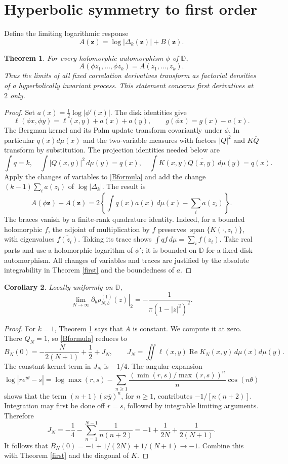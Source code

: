 \documentclass[11pt]{article}
\newtheorem{theorem}{Theorem}[section]
\newtheorem{corollary}[theorem]{Corollary}
\theoremstyle{remark}\newtheorem{remark}[theorem]{Remark}
\newcommand{\D}{\mathbb D}
\newcommand{\Rea}{\operatorname{Re}}
\begin{document}
\section{Hyperbolic symmetry to first order}
Define the limiting logarithmic response
\[
 A(\mathbf z)=\log|\Delta_k(\mathbf z)|+B(\mathbf z).
\]
\begin{theorem}\label{symmetry}
For every holomorphic automorphism $\phi$ of $\D$,
\[
 A(\phi z_1,\ldots,\phi z_k)=A(z_1,\ldots,z_k).
\]
Thus the limits of all fixed correlation derivatives transform as factorial
densities of a hyperbolically invariant process. This statement concerns
first derivatives at $2$ only.
\end{theorem}
\begin{proof}
Set $a(x)=\frac12\log|\phi'(x)|$. The disk identities give
\[
 \ell(\phi x,\phi y)=\ell(x,y)+a(x)+a(y),\qquad
 g(\phi x)=g(x)-a(x).
\]
The Bergman kernel and its Palm update transform covariantly under $\phi$.
In particular $q(x)d\mu(x)$ and the two-variable measures with factors
$|Q|^2$ and $K\overline Q$ transform by substitution. The projection
identities needed below are
\[
 \int q=k,\quad \int|Q(x,y)|^2\,d\mu(y)=q(x),\quad
 \int K(x,y)\overline{Q(x,y)}\,d\mu(y)=q(x).
\]
Apply the changes of variables to \eqref{Bformula} and add the change
$(k-1)\sum_i a(z_i)$ of $\log|\Delta_k|$. The result is
\[
 A(\phi\mathbf z)-A(\mathbf z)
       =2\left\{\int q(x)a(x)\,d\mu(x)-\sum_i a(z_i)\right\}.
\]
The braces vanish by a finite-rank quadrature identity. Indeed, for a
bounded holomorphic $f$, the adjoint of multiplication by $f$ preserves
$\operatorname{span}\{K(\cdot,z_i)\}$, with eigenvalues
$\overline{f(z_i)}$. Taking its trace shows
$\int q f\,d\mu=\sum_i f(z_i)$. Take real parts and use a holomorphic
logarithm of $\phi'$; it is bounded on $\D$ for a fixed disk automorphism.
All changes of variables and traces are justified by the absolute
integrability in Theorem \ref{first} and the boundedness of $a$.
\end{proof}

\begin{corollary}\label{intensityfirst}
Locally uniformly on $\D$,
\[
 \lim_{N\to\infty}\left.\partial_b\rho_{N,b}^{(1)}(z)\right|_2
       =-\frac1{\pi(1-|z|^2)^2}.
\]
\end{corollary}
\begin{proof}
For $k=1$, Theorem \ref{symmetry} says that $A$ is constant. We compute it
at zero. There $Q_N=1$, so \eqref{Bformula} reduces to
\[
 B_N(0)=-\frac{N}{2(N+1)}+\frac12+J_N,
 \qquad J_N=\iint\ell(x,y)\Rea K_N(x,y)\,d\mu(x)d\mu(y).
\]
The constant kernel term in $J_N$ is $-1/4$. The angular expansion
\[
 \log|re^{i\theta}-s|
 =\log\max(r,s)-\sum_{n\ge1}\frac{(\min(r,s)/\max(r,s))^n}{n}\cos(n\theta)
\]
shows that the term $(n+1)(x\overline y)^n$, for $n\ge1$, contributes
$-1/[n(n+2)]$. Integration may first be done off $r=s$, followed by
integrable limiting arguments. Therefore
\[
 J_N=-\frac14-\sum_{n=1}^{N-1}\frac1{n(n+2)}
       =-1+\frac1{2N}+\frac1{2(N+1)}.
\]
It follows that $B_N(0)=-1+1/(2N)+1/(N+1)\to-1$.
Combine this with Theorem \ref{first} and the diagonal of $K$.
\end{proof}
\end{document}
